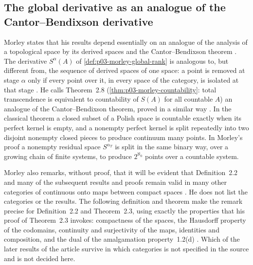 \subsection{The global derivative as an analogue of the Cantor--Bendixson derivative}
\label{sec:p03-w03-p03-034-analogue}

Morley states that his results depend essentially on an analogue of the
analysis of a topological space by its derived spaces and the
Cantor--Bendixson theorem \cite[p.~514]{Morley1965}. The derivative
\(S^\alpha(A)\) of \cref{def:p03-morley-global-rank} is analogous to,
but different from, the sequence of derived spaces of one space: a point is
removed at stage \(\alpha\) only if every point over it, in every space of
the category, is isolated at that stage \cite[pp.~514--515]{Morley1965}.
He calls Theorem~2.8 (\cref{thm:p03-morley-countability}: total
transcendence is equivalent to countability of \(S(A)\) for all countable
\(A\)) an analogue of the Cantor--Bendixson theorem, proved in a similar
way \cite[pp.~515 and 522]{Morley1965}. In the classical theorem a closed
subset of a Polish space is countable exactly when its perfect kernel is
empty, and a nonempty perfect kernel is split repeatedly into two disjoint
nonempty closed pieces to produce continuum many points. In Morley's
proof a nonempty residual space \(S^{\alpha_T}\) is split in the same
binary way, over a growing chain of finite systems, to produce \(2^{\aleph_0}\)
points over a countable system.

Morley also remarks, without proof, that it will be evident that Definition~2.2
and many of the subsequent results and proofs remain valid in many other
categories of continuous onto maps between compact spaces
\cite[p.~520]{Morley1965}. He does not list the categories or the
results. The following definition and theorem make the remark precise for
Definition~2.2 and Theorem~2.3, using exactly the properties that his proof
of Theorem~2.3 invokes: compactness of the spaces, the Hausdorff property of
the codomains, continuity and surjectivity of the maps, identities and
composition, and the dual of the amalgamation property~1.2(d)
\cite[pp.~520--521]{Morley1965}. Which of the later results of the
article survive in which categories is not specified in the source and is
not decided here.

